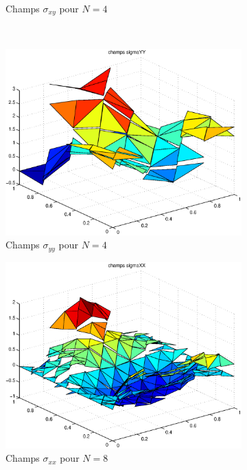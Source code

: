 \begin{figure}[h!]
\begin{subfigure}[b]{0.32\textwidth}
  \caption{Champs $\sigma_{xy}$ pour $N=4$}
  \end{subfigure}
  ~
  \begin{subfigure}[b]{0.32\textwidth}
  \includegraphics[width=\textwidth]{images/sigmayyN4.eps}
  \caption{Champs $\sigma_{yy}$ pour $N=4$}
  \end{subfigure}
  \begin{subfigure}[b]{0.32\textwidth}
  \includegraphics[width=\textwidth]{images/sigmaxxN8.eps}
  \caption{Champs $\sigma_{xx}$ pour $N=8$}
  \end{subfigure}
  ~
  \begin{subfigure}[b]{0.32\textwidth}

\end{subfigure}
\end{figure}
